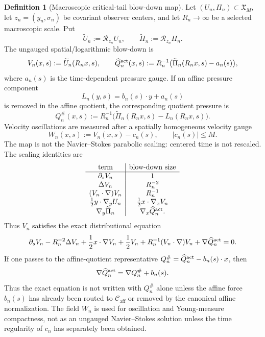 \documentclass[11pt]{amsart}
\numberwithin{equation}{section}
\theoremstyle{plain}
\theoremstyle{definition}
\newtheorem{definition}[definition]{Definition}
\theoremstyle{remark}
\newcommand{\calR}{\mathcal R}
\newcommand{\Caff}{\mathcal C_{\mathrm{aff}}}
\begin{document}
\begin{definition}[Macroscopic critical-tail blow-down map]
\label{def:macroscopic-critical-tail-blowdown}
Let \((U_n,\Pi_n)\subset\mathfrak X_M\), let
\(z_n=(y_n,\sigma_n)\) be covariant observer centers, and let
\(R_n\to\infty\) be a selected macroscopic scale.  Put
\[
   \widetilde U_n:=\calR_{z_n}U_n,\qquad
   \widetilde\Pi_n:=\calR_{z_n}\Pi_n .
\]
The ungauged spatial/logarithmic blow-down is
\[
   V_n(x,s):=\widetilde U_n(R_nx,s),
   \qquad
   \widehat Q_n^{\rm act}(x,s):=R_n^{-1}
      \bigl(\widetilde\Pi_n(R_nx,s)-a_n(s)\bigr),
\]
where \(a_n(s)\) is the time-dependent pressure gauge.  If an affine pressure
component
\[
   L_n(y,s)=b_n(s)\cdot y+a_n(s)
\]
is removed in the affine quotient, the corresponding quotient pressure is
\[
   Q_n^\#(x,s):=R_n^{-1}
      \bigl(\widetilde\Pi_n(R_nx,s)-L_n(R_nx,s)\bigr).
\]
Velocity oscillations are measured after a spatially homogeneous velocity gauge
\[
   W_n(x,s):=V_n(x,s)-c_n(s),
   \qquad |c_n(s)|\le M .
\]
The map is not the Navier--Stokes parabolic scaling: centered time is not
rescaled.  The scaling identities are
\[
\begin{array}{c|c}
\text{term} & \text{blow-down size}\\ \hline
\partial_s V_n & 1\\
\Delta V_n & R_n^{-2}\\
(V_n\cdot\nabla)V_n & R_n^{-1}\\
\frac12 y\cdot\nabla_y U_n & \frac12 x\cdot\nabla_xV_n\\
\nabla_y\widetilde\Pi_n & \nabla_x\widehat Q_n^{\rm act} .
\end{array}
\]
Thus \(V_n\) satisfies the exact distributional equation
\begin{equation}\label{eq:critical-tail-exact-blowdown-equation}
   \partial_sV_n
   -R_n^{-2}\Delta V_n
   +\frac12x\cdot\nabla V_n+\frac12V_n
   +R_n^{-1}(V_n\cdot\nabla)V_n
   +\nabla\widehat Q_n^{\rm act}
   =0 .
\end{equation}
If one passes to the affine-quotient representative
\(Q_n^\#=\widehat Q_n^{\rm act}-b_n(s)\cdot x\), then
\[
   \nabla\widehat Q_n^{\rm act}=\nabla Q_n^\#+b_n(s).
\]
Thus the exact equation is not written with \(Q_n^\#\) alone unless the affine
force \(b_n(s)\) has already been routed to \(\Caff\) or removed by the
canonical affine normalization.  The field \(W_n\) is used for oscillation and
Young-measure compactness, not as an ungauged Navier--Stokes solution unless the
time regularity of \(c_n\) has separately been obtained.
\end{definition}
\end{document}
